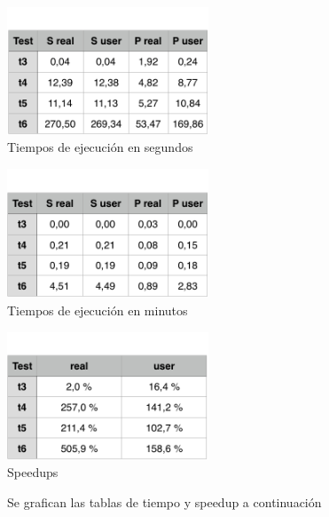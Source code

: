 \documentclass[10pt]{extarticle}
\begin{document}
\begin{center}
 \includegraphics[width=6cm]{imgs/table_seconds.png}\\
 \footnotesize{Tiempos de ejecución en segundos}\\
\end{center}

\begin{center}
 \includegraphics[width=6cm]{imgs/table_minutes.png}\\
 \footnotesize{Tiempos de ejecución en minutos}\\
\end{center}

\begin{center}
 \includegraphics[width=6cm]{imgs/table_speedup.png}\\
 \footnotesize{Speedups}\\
\end{center}

Se grafican las tablas de tiempo y speedup a continuación
\end{document}
